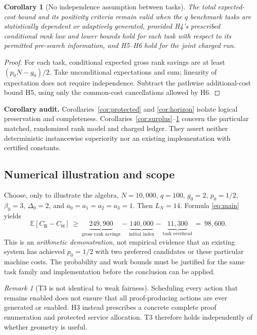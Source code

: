\documentclass[11pt,letterpaper]{article}
\newtheorem{corollary}[theorem]{Corollary}
\theoremstyle{definition}
\theoremstyle{remark}
\newtheorem{remark}[theorem]{Remark}
\newcommand{\E}{\mathbb{E}}
\newcommand{\Hsys}{\mathsf H}
\newcommand{\Bsys}{\mathsf B}
\begin{document}
\begin{corollary}[No independence assumption between tasks]\label{cor:dependence}
The total expected-cost bound and its positivity criteria remain valid when the $q$ benchmark tasks are statistically dependent or adaptively generated, provided H4's prescribed conditional rank law and lower bounds hold for each task with respect to its permitted pre-search information, and H5--H6 hold for the joint charged run.
\end{corollary}
\begin{proof}
For each task, conditional expected gross rank savings are at least $(p_0N-g_0)/2$. Take unconditional expectations and sum; linearity of expectation does not require independence. Subtract the pathwise additional-cost bound H5, using only the common-cost cancellations allowed by H6.
\end{proof}

\noindent\textbf{Corollary audit.} Corollaries~\ref{cor:protected} and \ref{cor:horizon} isolate logical preservation and completeness. Corollaries~\ref{cor:surplus}--\ref{cor:dependence} concern the particular matched, randomized rank model and charged ledger. They assert neither deterministic instancewise superiority nor an existing implementation with certified constants.

\subsection{Numerical illustration and scope}
Choose, only to illustrate the algebra, $N=10{,}000$, $q=100$, $g_0=2$, $p_0=1/2$, $\beta_0=3$, $\Delta_0=2$, and $a_0=a_1=a_2=a_3=1$. Then $L_N=14$. Formula \eqref{eq:main} yields
\[
 \E[C_{\Bsys}-C_{\Hsys}]\ \ge\ \underbrace{249{,}900}_{\text{gross rank savings}}
 -\underbrace{140{,}000}_{\text{initial index}}-
 \underbrace{11{,}300}_{\text{task overhead}}\ =\ \boxed{98{,}600}.
\]
This is an \emph{arithmetic demonstration}, not empirical evidence that an existing system has achieved $p_0=1/2$ with two preferred candidates or these particular machine costs. The probability and work bounds must be justified for the same task family and implementation before the conclusion can be applied.

\begin{remark}[T3 is not identical to weak fairness]
Scheduling every action that remains enabled does not ensure that all proof-producing actions are ever generated or enabled. H3 instead prescribes a concrete complete proof enumeration and protected service allocation. T3 therefore holds independently of whether geometry is useful.
\end{remark}
\end{document}
